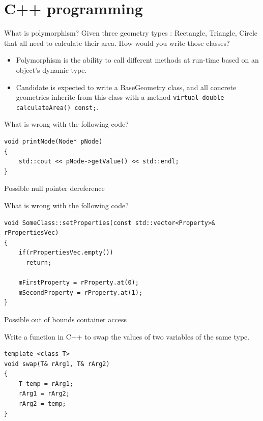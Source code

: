 \documentclass{exam}
\begin{document}
\section{C++ programming}
\begin{questions}
\question What is polymorphism? Given three geometry types : Rectangle, Triangle, Circle that all need to calculate their area. How would you write those classes?
\begin{solution}[.2in]
\begin{itemize}
	\item Polymorphism is the ability to call different methods at run-time based on an object’s dynamic type. 
	\item Candidate is expected to write a BaseGeometry class, and all concrete geometries inherite from this class with a method \lstinline{virtual double calculateArea() const;}.
\end{itemize}
\end{solution}

\question What is wrong with the following code?
\begin{lstlisting}
void printNode(Node* pNode)
{
    std::cout << pNode->getValue() << std::endl;
}
\end{lstlisting}
\begin{solution}[.2in]
Possible null pointer dereference
\end{solution}

\question What is wrong with the following code?
\begin{lstlisting}
void SomeClass::setProperties(const std::vector<Property>& 
rPropertiesVec)
{
    if(rPropertiesVec.empty())
      return;

    mFirstProperty = rProperty.at(0);
    mSecondProperty = rProperty.at(1);
}
\end{lstlisting}
\begin{solution}[.2in]
Possible out of bounds container access
\end{solution}

\question Write a function in C++ to swap the values of two variables of the same type.
\begin{solution}[.2in]
\begin{lstlisting}
template <class T>
void swap(T& rArg1, T& rArg2)
{
	T temp = rArg1;
	rArg1 = rArg2;
	rArg2 = temp;
}
\end{lstlisting}
\end{solution}


\end{questions}
\end{document}
